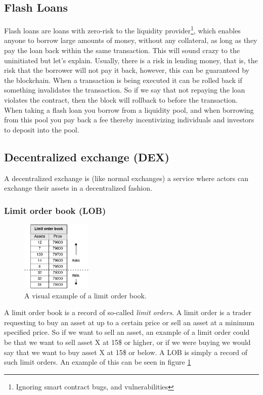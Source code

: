\subsection{Flash Loans}
Flash loans are loans with zero-risk to the liquidity provider\footnote{Ignoring
smart contract bugs, and vulnerabilities}, which enables anyone to borrow large
amounts of money, without any collateral, as long as they pay the loan
back within the same transaction. This will sound crazy to the uninitiated but
let's explain. Usually, there is a risk in lending money, that is, the risk that
the borrower will not pay it back, however, this can be guaranteed by the
blockchain. When a transaction is being executed it can be rolled back if
something invalidates the transaction. So if we say that not repaying the loan
violates the contract, then the block will rollback to before the
transaction.\\

When taking a flash loan you borrow from a liquidity pool, and when borrowing
from this pool you pay back a fee thereby incentivizing individuals and
investors to deposit into the pool.

\subsection{Decentralized exchange (DEX)}
A decentralized exchange is (like normal exchanges) a service where actors can
exchange their assets in a decentralized fashion.

\subsubsection{Limit order book (LOB)}
\begin{figure}
  \centering
  \includegraphics[width=0.3\textwidth]{assests/Flash-loans-LOB}
  \caption{A visual example of a limit order book.}
  \label{fig:LOB}
\end{figure}
A limit order book is a record of so-called \textit{limit orders}. A limit order
is a trader requesting to buy an asset at up to a certain price or sell an
asset at a minimum specified price. So if we want to sell an asset, an example of
a limit order could be that we want to sell asset X at 15\$ or higher, or if we
were buying we would say that we want to buy asset X at 15\$ or below. A LOB is
simply a record of such limit orders. An example of this can be seen in figure
\ref{fig:LOB}

